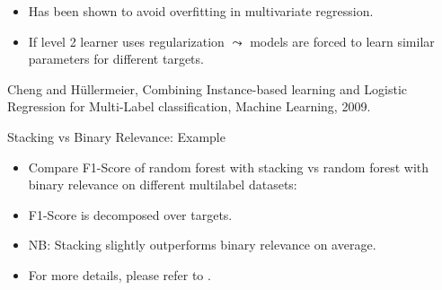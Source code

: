 \documentclass[11pt,compress,t,notes=noshow, xcolor=table]{beamer}
\begin{document}
\begin{frame}
\begin{itemize}
		\item Has been shown to avoid overfitting in multivariate regression.
        \vspace{5pt}
        
		\item If level 2 learner uses regularization $\leadsto$ models are forced to learn similar parameters for different targets.  
	\end{itemize}
	{\tiny Cheng and H\"ullermeier, Combining Instance-based learning and Logistic Regression for Multi-Label classification, Machine Learning, 2009.}
	
\end{frame}

\begin{frame}{Stacking vs Binary Relevance: Example}

               \begin{itemize}
               
                   \item Compare F1-Score of random forest with stacking vs random forest with binary relevance on different multilabel datasets:
                   \vspace{5pt}
                   
                   \begin{center}
                   \end{center}
                   
                   \vspace{5pt}
                   \item F1-Score is decomposed over targets.
 
                  \vspace{5pt}
                   \item NB: Stacking slightly outperforms binary relevance on average.

                   \vspace{5pt}
                   \item For more details, please refer to \href{https://journal.r-project.org/archive/2017/RJ-2017-012/RJ-2017-012.pdf}{}.
               \end{itemize}


\end{frame}
\end{document}
